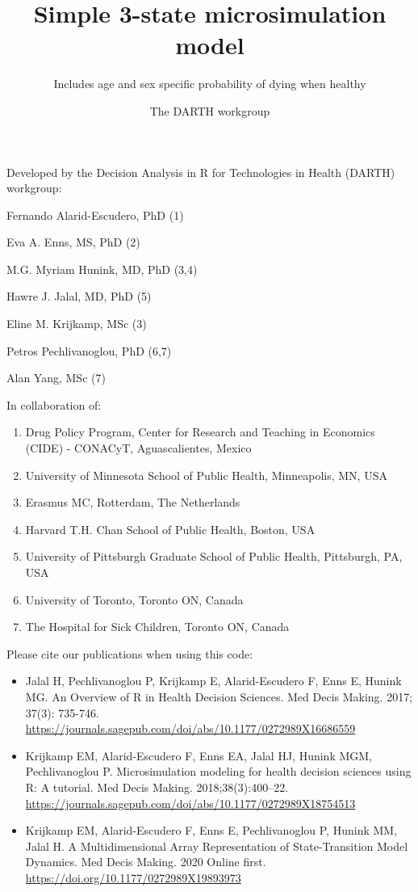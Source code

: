 \documentclass[
]{article}
\title{Simple 3-state microsimulation model}
\subtitle{Includes age and sex specific probability of dying when healthy}
\author{The DARTH workgroup}
\date{}
\providecommand{\tightlist}{%
  \setlength{\itemsep}{0pt}\setlength{\parskip}{0pt}}
\begin{document}
\maketitle

Developed by the Decision Analysis in R for Technologies in Health
(DARTH) workgroup:

Fernando Alarid-Escudero, PhD (1)

Eva A. Enns, MS, PhD (2)

M.G. Myriam Hunink, MD, PhD (3,4)

Hawre J. Jalal, MD, PhD (5)

Eline M. Krijkamp, MSc (3)

Petros Pechlivanoglou, PhD (6,7)

Alan Yang, MSc (7)

In collaboration of:

\begin{enumerate}
\def\labelenumi{\arabic{enumi}.}
\tightlist
\item
  Drug Policy Program, Center for Research and Teaching in Economics
  (CIDE) - CONACyT, Aguascalientes, Mexico
\item
  University of Minnesota School of Public Health, Minneapolis, MN, USA
\item
  Erasmus MC, Rotterdam, The Netherlands
\item
  Harvard T.H. Chan School of Public Health, Boston, USA
\item
  University of Pittsburgh Graduate School of Public Health, Pittsburgh,
  PA, USA
\item
  University of Toronto, Toronto ON, Canada
\item
  The Hospital for Sick Children, Toronto ON, Canada
\end{enumerate}

Please cite our publications when using this code:

\begin{itemize}
\item
  Jalal H, Pechlivanoglou P, Krijkamp E, Alarid-Escudero F, Enns E,
  Hunink MG. An Overview of R in Health Decision Sciences. Med Decis
  Making. 2017; 37(3): 735-746.
  \url{https://journals.sagepub.com/doi/abs/10.1177/0272989X16686559}
\item
  Krijkamp EM, Alarid-Escudero F, Enns EA, Jalal HJ, Hunink MGM,
  Pechlivanoglou P. Microsimulation modeling for health decision
  sciences using R: A tutorial. Med Decis Making. 2018;38(3):400--22.
  \url{https://journals.sagepub.com/doi/abs/10.1177/0272989X18754513}
\item
  Krijkamp EM, Alarid-Escudero F, Enns E, Pechlivanoglou P, Hunink MM,
  Jalal H. A Multidimensional Array Representation of State-Transition
  Model Dynamics. Med Decis Making. 2020 Online first.
  \url{https://doi.org/10.1177/0272989X19893973}
\end{itemize}
\end{document}
